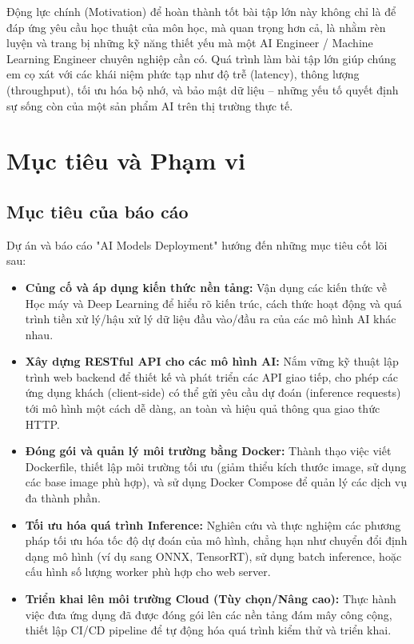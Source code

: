 Động lực chính (Motivation) để hoàn thành tốt bài tập lớn này không chỉ là để đáp ứng yêu cầu học thuật của môn học, mà quan trọng hơn cả, là nhằm rèn luyện và trang bị những kỹ năng thiết yếu mà một AI Engineer / Machine Learning Engineer chuyên nghiệp cần có. Quá trình làm bài tập lớn giúp chúng em cọ xát với các khái niệm phức tạp như độ trễ (latency), thông lượng (throughput), tối ưu hóa bộ nhớ, và bảo mật dữ liệu – những yếu tố quyết định sự sống còn của một sản phẩm AI trên thị trường thực tế.

\newpage
\section{Mục tiêu và Phạm vi}

\subsection{Mục tiêu của báo cáo}

Dự án và báo cáo "AI Models Deployment" hướng đến những mục tiêu cốt lõi sau:
\begin{itemize}
    \item \textbf{Củng cố và áp dụng kiến thức nền tảng:} Vận dụng các kiến thức về Học máy và Deep Learning để hiểu rõ kiến trúc, cách thức hoạt động và quá trình tiền xử lý/hậu xử lý dữ liệu đầu vào/đầu ra của các mô hình AI khác nhau.
    \item \textbf{Xây dựng RESTful API cho các mô hình AI:} Nắm vững kỹ thuật lập trình web backend để thiết kế và phát triển các API giao tiếp, cho phép các ứng dụng khách (client-side) có thể gửi yêu cầu dự đoán (inference requests) tới mô hình một cách dễ dàng, an toàn và hiệu quả thông qua giao thức HTTP.
    \item \textbf{Đóng gói và quản lý môi trường bằng Docker:} Thành thạo việc viết Dockerfile, thiết lập môi trường tối ưu (giảm thiểu kích thước image, sử dụng các base image phù hợp), và sử dụng Docker Compose để quản lý các dịch vụ đa thành phần.
    \item \textbf{Tối ưu hóa quá trình Inference:} Nghiên cứu và thực nghiệm các phương pháp tối ưu hóa tốc độ dự đoán của mô hình, chẳng hạn như chuyển đổi định dạng mô hình (ví dụ sang ONNX, TensorRT), sử dụng batch inference, hoặc cấu hình số lượng worker phù hợp cho web server.
    \item \textbf{Triển khai lên môi trường Cloud (Tùy chọn/Nâng cao):} Thực hành việc đưa ứng dụng đã được đóng gói lên các nền tảng đám mây công cộng, thiết lập CI/CD pipeline để tự động hóa quá trình kiểm thử và triển khai.
\end{itemize}

